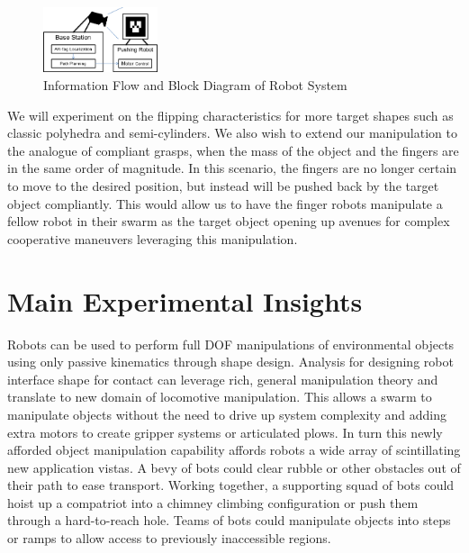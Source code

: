 \documentclass[runningheads,a4paper]{llncs}
\begin{document}
\begin{figure}[h!]
\centering
\includegraphics[width=0.3\textwidth]{System_Block_Diagram.png}
\caption{\label{fig:system}Information Flow and Block Diagram of Robot System}
\end{figure}

We will experiment on the flipping characteristics for more target shapes such as classic polyhedra and semi-cylinders.
We also wish to extend our manipulation to the analogue of compliant grasps, when the mass of the object and the fingers are in the same order of magnitude.
In this scenario, the fingers are no longer certain to move to the desired position, but instead will be pushed back by the target object compliantly.
This would allow us to have the finger robots manipulate a fellow robot in their swarm as the target object opening up avenues for complex cooperative maneuvers leveraging this manipulation.

\clearpage
\section{Main Experimental Insights}
Robots can be used to perform full DOF manipulations of environmental objects using only passive kinematics through shape design.
Analysis for designing robot interface shape for contact can leverage rich, general manipulation theory and translate to new domain of locomotive manipulation.
This allows a swarm to manipulate objects without the need to drive up system complexity and adding extra motors to create gripper systems or articulated plows.
In turn this newly afforded object manipulation capability affords robots a wide array of scintillating new application vistas.
A bevy of bots could clear rubble or other obstacles out of their path to ease transport.
Working together, a supporting squad of bots could hoist up a compatriot into a chimney climbing configuration or push them through a hard-to-reach hole.
Teams of bots could manipulate objects into steps or ramps to allow access to previously inaccessible regions.

\clearpage


\end{document}
